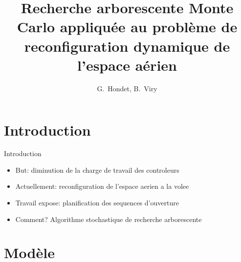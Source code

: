\documentclass[tikz]{beamer}
\title[Reconfiguration par Monte Carlo]{%
  Recherche arborescente Monte Carlo appliquée au problème de reconfiguration
  dynamique de l'espace aérien
}
\author[Hondet, Viry]{G.~Hondet, B.~Viry}
\begin{document}
\begin{frame}
  \titlepage{}
\end{frame}


\section*{Introduction}

\begin{frame}[c]{Introduction}
  \begin{itemize}
    \item But: diminution de la charge de travail des controleurs
    \item Actuellement: reconfiguration de l'espace aerien a la volee
    \item Travail expose: planification des sequences d'ouverture
    \item Comment? Algorithme stochastique de recherche arborescente
  \end{itemize}
\end{frame}

\section{Modèle}
\end{document}

